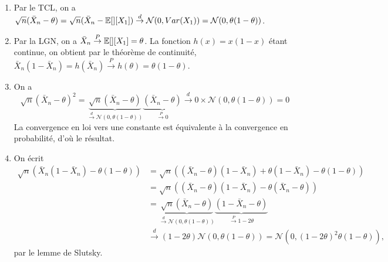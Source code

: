 \begin{solution}
  \begin{enumerate}
    \item Par le TCL, on a $\sqrt{n} ( \bar{X}_n - \theta)=\sqrt{n} ( \bar{X}_n -
            \mathbb{E}[][X_1]) \overset{d}{\rightarrow} \mathcal N(0,Var(X_1))=\mathcal N
            (0,\theta(1-\theta))$.
    \item Par la LGN, on a $\bar{X}_n \overset{P}{\rightarrow}\mathbb{E}[][X_1]=\theta$.
          La fonction $h(x)=x(1-x)$ \'etant continue, on obtient par le th\'eor\`eme de
          continuit\'e, $\bar{X}_n(1-\bar{X}_n)=h(\bar{X}_n)\overset{P}{\rightarrow}
            h(\theta)=\theta(1-\theta)$.
    \item On a
          \[
            \sqrt{n} ( \bar{X}_n - \theta)^2= \underbrace{\sqrt{n} ( \bar{X}_n -
              \theta)}_{\overset{d}{\rightarrow} \mathcal N
              (0,\theta(1-\theta))}\underbrace{( \bar{X}_n -
              \theta)}_{\overset{P}{\rightarrow} 0} \overset{d}{\rightarrow} 0\times \mathcal
            N (0,\theta(1-\theta))=0
          \]
          La convergence en loi vers une constante est \'equivalente \`a la convergence
          en probabilit\'e, d'o\`u le r\'esultat.
    \item On \'ecrit
          \begin{align*}
            \sqrt{n} \left( \bar{X}_n (1 - \bar{X}_n) - \theta(1-\theta) \right)
             & = \sqrt{n} \left( (\bar{X}_n-\theta) (1 - \bar{X}_n)+\theta(1 - \bar{X}_n) - \theta(1-\theta) \right)                                                                            \\
             & = \sqrt{n} \left( (\bar{X}_n-\theta) (1 - \bar{X}_n)-\theta( \bar{X}_n -\theta) \right)                                                                                          \\
             & = \underbrace{\sqrt{n}   (\bar{X}_n-\theta)}_{\overset{d}{\rightarrow} \mathcal N (0,\theta(1-\theta))} \underbrace{(1 - \bar{X}_n-\theta)}_{\overset{P}{\rightarrow} 1-2\theta} \\
             & \overset{d}{\rightarrow} (1-2\theta) \mathcal N (0,\theta(1-\theta))= \mathcal N (0,{(1-2\theta)}^2\theta(1-\theta)),
          \end{align*}
          par le lemme de Slutsky.
  \end{enumerate}
\end{solution}

